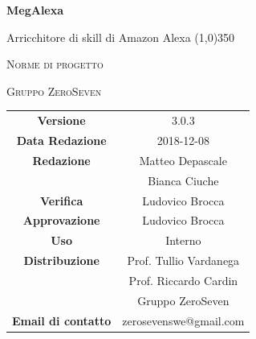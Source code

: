\documentclass[a4paper,12pt,openany]{book}
\author{Bratzu Gian Marco}
\date{2018-12-08}
\begin{document}
\begin{titlepage}
	\centering
	{\huge\bfseries MegAlexa\par}
	Arricchitore di skill di Amazon Alexa
	\line(1,0){350} \\
	{\scshape\LARGE Norme di progetto \par}
	\vspace{1cm}
	{\scshape Gruppo ZeroSeven \par}
	\logo
	\begin{tabular}{c|c}
		{\hfill \textbf{Versione}} 			& 3.0.3			\\
		{\hfill\textbf{Data Redazione}} 	& 2018-12-08		\\ 
		{\hfill\textbf{Redazione}} 			&  		Matteo Depascale\\&Bianca Ciuche\\
		{\hfill\textbf{Verifica}} 				& Ludovico Brocca	\\ 
		{\hfill\textbf{Approvazione}} 		&  		Ludovico Brocca			\\ 
		{\hfill\textbf{Uso}} 					& 		Interno		\\ 
		{\hfill\textbf{Distribuzione}} 			& 			Prof. Tullio Vardanega \\ & Prof. Riccardo Cardin \\ & Gruppo ZeroSeven \\
		{\hfill\textbf{Email di contatto}} & zerosevenswe@gmail.com \\
	\end{tabular}
\end{titlepage}
	

	
	\label{LastFrontPage}
	\newpage	
	
	\pagestyle{mymain}
	\tableofcontents
	
	
	
	
	\appendix
			
	\label{LastPage}
\end{document}
